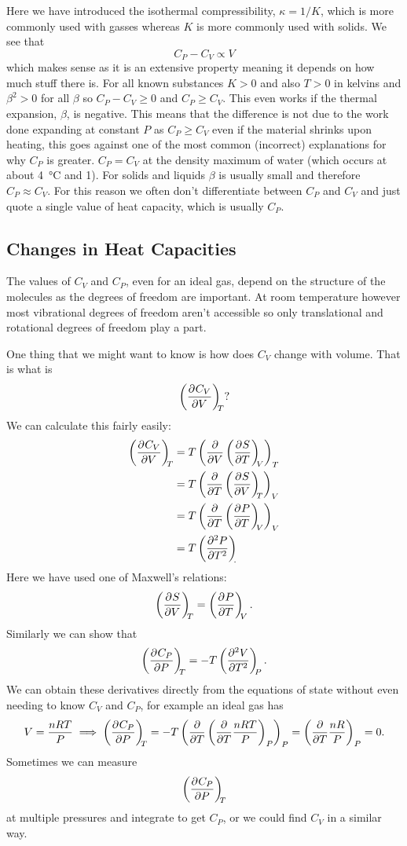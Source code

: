 \documentclass[a4paper]{article}
\begin{document}
    Here we have introduced the isothermal compressibility, \(\kappa = 1/K\), which is more commonly used with gasses whereas \(K\) is more commonly used with solids.
    We see that
    \[C_P - C_V \propto V\]
    which makes sense as it is an extensive property meaning it depends on how much stuff there is.
    For all known substances \(K > 0\) and also \(T > 0\) in kelvins and \(\beta^2 > 0\) for all \(\beta\) so \(C_P - C_V \ge 0\) and \(C_P \ge C_V\).
    This even works if the thermal expansion, \(\beta\), is negative.
    This means that the difference is not due to the work done expanding at constant \(P\) as \(C_P \ge C_V\) even if the material shrinks upon heating, this goes against one of the most common (incorrect) explanations for why \(C_P\) is greater.
    \(C_P = C_V\) at the density maximum of water (which occurs at about \SI{4}{\degreeCelsius} and \SI{1}{\atm}).
    For solids and liquids \(\beta\) is usually small and therefore \(C_P \approx C_V\).
    For this reason we often don't differentiate between \(C_P\) and \(C_V\) and just quote a single value of heat capacity, which is usually \(C_P\).
    
    \subsection{Changes in Heat Capacities}\label{sec:changes in heat capacities}
    The values of \(C_V\) and \(C_P\), even for an ideal gas, depend on the structure of the molecules as the degrees of freedom are important.
    At room temperature however most vibrational degrees of freedom aren't accessible so only translational and rotational degrees of freedom play a part.
    
    One thing that we might want to know is how does \(C_V\) change with volume.
    That is what is
    \[\left(\pdv[]{C_V}{V}\right)_{\!\!{T}}?\]
    We can calculate this fairly easily:
    \begin{align*}
        \pdvconst{C_V}{V}{T} &= T\left(\pdv{V}\pdvconst{S}{T}{V}\right)_T\\
        &= T\left(\pdv{T}\pdvconst{S}{V}{T}\right)_V\\
        &= T\left(\pdv{T}\pdvconst{P}{T}{V}\right)_V\\
        &= T\pdvconst[2]{P}{T}.
    \end{align*}
    Here we have used one of Maxwell's relations:
    \[\left(\pdv[]{S}{V}\right)_{\!\!{T}} = \left(\pdv[]{P}{T}\right)_{\!\!{V}}.\]
    Similarly we can show that
    \[\left(\pdv[]{C_P}{P}\right)_{\!\!{T}} = -T\left(\pdv[2]{V}{T}\right)_{\!\!{P}}.\]
    We can obtain these derivatives directly from the equations of state without even needing to know \(C_V\) and \(C_P\), for example an ideal gas has
    \[V = \frac{nRT}{P} \implies \left(\pdv[]{C_P}{P}\right)_{\!\!{T}} = -T\left(\pdv{T}\left(\pdv{T}\frac{nRT}{P}\right)_P\right)_P = \left(\pdv{T}\frac{nR}{P}\right)_P = 0.\]
    Sometimes we can measure
    \[\left(\pdv[]{C_P}{P}\right)_{\!\!{T}}\]
    at multiple pressures and integrate to get \(C_P\), or we could find \(C_V\) in a similar way.
    
\end{document}
